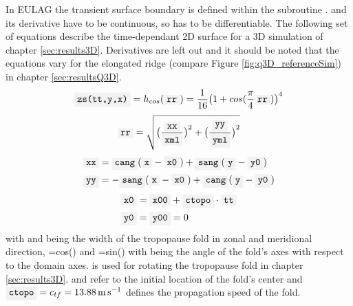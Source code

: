 In EULAG the transient surface boundary  is defined within the subroutine .  and its derivative  have to be continuous, so  has to be differentiable. The following set of equations describe the time-dependant 2D surface  for a 3D simulation of chapter \ref{sec:results3D}. Derivatives are left out and it should be noted that the equations vary for the elongated ridge (compare Figure \ref{fig:q3D_referenceSim}) in chapter \ref{sec:resultsQ3D}.
\begin{equation}
    \code{zs(tt,y,x)} = h_{cos}(\code{rr}) =\frac{1}{16} \bigl(1+cos(\frac{\pi}{4} \code{rr})\bigr)^4
    \label{equ:cosMtn-1}
\end{equation}
\begin{equation}
    \code{rr} = \sqrt{\bigl(\frac{\code{xx}}{\code{xml}}\bigr)^2 + \bigl(\frac{\code{yy}}{\code{yml}}\bigr)^2}
    \label{equ:cosMtn-2}
\end{equation}
\begin{equation}
    \begin{aligned}
        \code{xx} &= \code{cang}(\code{x}-\code{x0}) + \code{sang}(\code{y}-\code{y0}) \\
        \code{yy} &=-\code{sang}(\code{x}-\code{x0}) + \code{cang}(\code{y}-\code{y0}) 
    \end{aligned}
    \label{equ:cosMtn-3}
\end{equation}
\begin{equation}
    \begin{aligned}
    \code{x0} &= \code{x00} + \code{ctopo} \cdot \code{tt} \\ 
    \code{y0} &= \code{y00} = 0
    \label{equ:cosMtn-4}
    \end{aligned}
\end{equation}
with  and  being the width of the tropopause fold in zonal and meridional direction, =cos() and =sin() with  being the angle of the fold's axes with respect to the domain axes.  is used for rotating the tropopause fold in chapter \ref{sec:results3D}.  and  refer to the initial location of the fold's center and $\code{ctopo}=c_{tf}=\SI{13.88}{\meter \per \second}$ defines the propagation speed of the fold.

